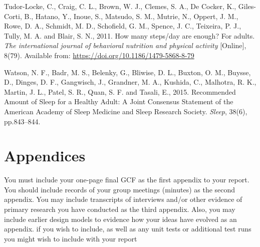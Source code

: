 \documentclass[12pt]{article}
\begin{document}
\begin{thebibliography}{99}
    Tudor-Locke, C., Craig, C. L., Brown, W. J., Clemes, S. A., De Cocker, K., 
    Giles-Corti, B., Hatano, Y., Inoue, S., Matsudo, S. M., Mutrie, N., Oppert, J. M., Rowe, D. A., 
    Schmidt, M. D., Schofield, G. M., Spence, J. C., Teixeira, P. J., Tully, M. A. and Blair, S. N., 2011. 
    How many steps/day are enough? For adults. 
    \textit{The international journal of behavioral nutrition and physical activity} 
    [Online], 8(79). Available from: \url{https://doi.org/10.1186/1479-5868-8-79}

    Watson, N. F., Badr, M. S., Belenky, G., Bliwise, D. L., Buxton, O. M., Buysse, D., 
    Dinges, D. F., Gangwisch, J., Grandner, M. A., Kushida, C., Malhotra, R. K., Martin, J. L., Patel, S. R., 
    Quan, S. F. and Tasali, E., 2015. 
    Recommended Amount of Sleep for a Healthy Adult: 
    A Joint Consensus Statement of the American Academy of Sleep Medicine and Sleep Research Society. 
    \textit{Sleep}, 38(6), pp.843–844.
\end{thebibliography}


\section{Appendices}
You must include your one-page final GCF as the first appendix to your report. You should
include records of your group meetings (minutes) as the second appendix. You may include
transcripts of interviews and/or other evidence of primary research you have conducted as
the third appendix.
Also, you may include earlier design models to evidence how your ideas have evolved as an
appendix. if you wish to include, as well as any unit tests or additional test runs you might
wish to include with your report
\end{document}
